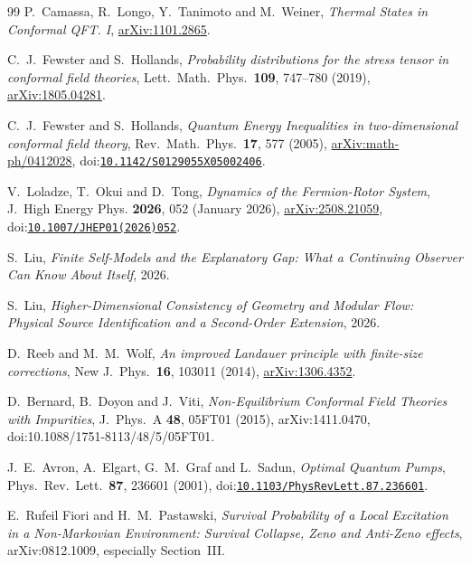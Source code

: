 \begin{thebibliography}{99}
P.~Camassa, R.~Longo, Y.~Tanimoto and M.~Weiner,
\emph{Thermal States in Conformal QFT. I},
\href{https://arxiv.org/abs/1101.2865}{arXiv:1101.2865}.

C.~J.~Fewster and S.~Hollands,
\emph{Probability distributions for the stress tensor in conformal
field theories}, Lett.~Math.~Phys.~\textbf{109}, 747--780 (2019),
\href{https://arxiv.org/abs/1805.04281}{arXiv:1805.04281}.

C.~J.~Fewster and S.~Hollands,
\emph{Quantum Energy Inequalities in two-dimensional conformal field theory},
Rev.~Math.~Phys.~\textbf{17}, 577 (2005),
\href{https://arxiv.org/abs/math-ph/0412028}{arXiv:math-ph/0412028},
doi:\href{https://doi.org/10.1142/S0129055X05002406}{\nolinkurl{10.1142/S0129055X05002406}}.

V.~Loladze, T.~Okui and D.~Tong,
\emph{Dynamics of the Fermion-Rotor System}, J.~High Energy Phys.
\textbf{2026}, 052 (January 2026),
\href{https://arxiv.org/abs/2508.21059}{arXiv:2508.21059},
doi:\href{https://doi.org/10.1007/JHEP01(2026)052}{\nolinkurl{10.1007/JHEP01(2026)052}}.

S.~Liu, \emph{Finite Self-Models and the Explanatory Gap: What a
Continuing Observer Can Know About Itself}, 2026.

S.~Liu, \emph{Higher-Dimensional Consistency of Geometry and Modular Flow: Physical Source Identification and a Second-Order Extension},
2026.

D.~Reeb and M.~M.~Wolf,
\emph{An improved Landauer principle with finite-size corrections},
New J.~Phys.~\textbf{16}, 103011 (2014),
\href{https://arxiv.org/abs/1306.4352}{arXiv:1306.4352}.


D.~Bernard, B.~Doyon and J.~Viti,
\emph{Non-Equilibrium Conformal Field Theories with Impurities},
J.~Phys.~A \textbf{48}, 05FT01 (2015), arXiv:1411.0470,
doi:10.1088/1751-8113/48/5/05FT01.

J.~E.~Avron, A.~Elgart, G.~M.~Graf and L.~Sadun,
\emph{Optimal Quantum Pumps}, Phys.~Rev.~Lett.~\textbf{87}, 236601
(2001), doi:\href{https://doi.org/10.1103/PhysRevLett.87.236601}{\nolinkurl{10.1103/PhysRevLett.87.236601}}.

E.~Rufeil Fiori and H.~M.~Pastawski, \emph{Survival Probability of a Local
Excitation in a Non-Markovian Environment: Survival Collapse, Zeno and
Anti-Zeno effects}, arXiv:0812.1009, especially Section~III.


\end{thebibliography}
